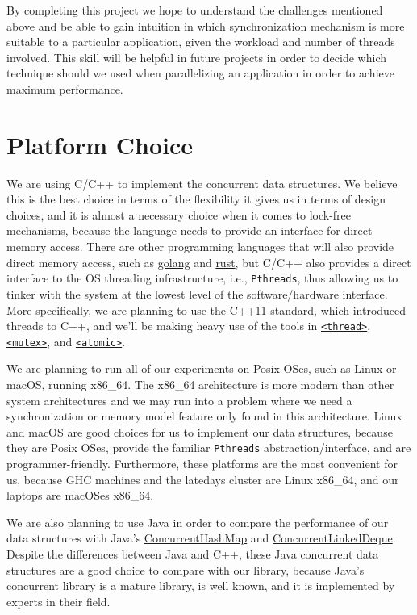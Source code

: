 \documentclass[11pt]{article}
\begin{document}
By completing this project we hope to understand the challenges mentioned above
and be able to gain intuition in which synchronization mechanism is more
suitable to a particular application, given the workload and number of threads
involved. This skill will be helpful in future projects in order to decide which
technique should we used when parallelizing an application in order to achieve
maximum performance.

\section*{Platform Choice}
We are using C/C++ to implement the concurrent data structures. We believe this
is the best choice in terms of the flexibility it gives us in terms of design
choices, and it is almost a necessary choice when it comes to lock-free
mechanisms, because the language needs to provide an interface for direct memory
access. There are other programming languages that will also provide direct
memory access, such as \href{https://golang.org/}{golang} and
\href{https://www.rust-lang.org/en-US/}{rust}, but C/C++ also provides a direct
interface to the OS threading infrastructure, i.e., \texttt{Pthreads}, thus
allowing us to tinker with the system at the lowest level of the software/hardware
interface. More specifically, we are planning to use the C++11 standard, which
introduced threads to C++, and we'll be making heavy use of the tools in
\href{http://en.cppreference.com/w/cpp/header/thread}{\texttt{<thread>}},
\href{http://en.cppreference.com/w/cpp/header/mutex}{\texttt{<mutex>}}, and
\href{http://en.cppreference.com/w/cpp/header/atomic}{\texttt{<atomic>}}.

We are planning to run all of our experiments on Posix OSes, such as Linux or
macOS, running x86\_64. The x86\_64 architecture is more modern than other
system architectures and we may run into a problem where we need a
synchronization or memory model feature only found in this architecture. Linux
and macOS are good choices for us to implement our data structures, because they
are Posix OSes, provide the familiar \texttt{Pthreads} abstraction/interface,
and are programmer-friendly. Furthermore, these platforms are the most
convenient for us, because GHC machines and the latedays cluster are Linux
x86\_64, and our laptops are macOSes x86\_64.

We are also planning to use Java in order to compare the performance of our data structures with Java's
\href{https://docs.oracle.com/javase/8/docs/api/java/util/concurrent/ConcurrentHashMap.html}{ConcurrentHashMap} and
\href{https://docs.oracle.com/javase/8/docs/api/java/util/concurrent/ConcurrentLinkedDeque.html}{ConcurrentLinkedDeque}.
Despite the differences between Java and C++, these Java concurrent data
structures are a good choice to compare with our library, because Java's
concurrent library is a mature library, is well known, and it is implemented by
experts in their field.
\end{document}
